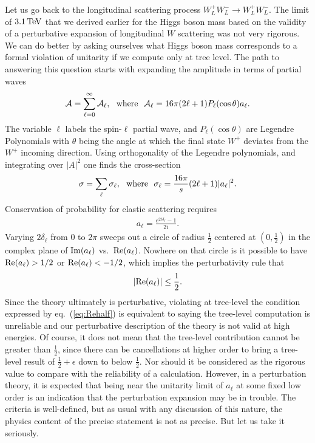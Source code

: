 \documentclass[12pt]{article}
\def\beq{\begin{eqnarray}}
\def\eeq{\end{eqnarray}}
\def\tev{\, {\rm TeV}}
\def\eq#1{eq.~(\ref{#1})}
\begin{document}
Let us go back to the longitudinal scattering process $W^+_LW^-_L\to W^+_LW^-_L$. The limit of $3.1\tev$ that we derived earlier for the Higgs boson mass based on the validity of a perturbative expansion of longitudinal $W$ scattering was not very rigorous. We can do better by asking ourselves what Higgs boson mass corresponds to a formal violation of unitarity if we compute only at tree level. The path to answering this question starts with expanding the amplitude in terms of 
partial waves~\cite{partial wave}
\beq
{\cal A}=\sum_{\ell=0}^\infty {\cal A}_\ell,~~{\rm where}~~{\cal A}_\ell=16\pi(2\ell +1)P_\ell(\cos\theta)a_\ell .
\eeq
The variable $\ell$ labels the spin-$\ell$ partial wave, and $P_\ell(\cos\theta)$ are Legendre Polynomials with $\theta$ being the angle at which the final state $W^+$ deviates from the $W^+$ incoming direction.  Using orthogonality of the Legendre polynomials, and integrating over $|A|^2$ one finds the cross-section
\beq
\sigma=\sum_\ell \sigma_\ell,~~{\rm where}~~\sigma_\ell=\frac{16\pi}{s}(2\ell +1) |a_\ell |^2.
\label{eq:sigma1}
\eeq
Conservation of probability for elastic scattering requires
\beq
a_\ell =\frac{e^{2i\delta_\ell}-1}{2i}.
\label{eq:al}
\eeq
Varying $2\delta_\ell$ from $0$ to $2\pi$ sweeps out a circle of radius $\frac{1}{2}$ centered at $(0,\frac{1}{2})$ in the complex plane of ${\rm Im}(a_\ell)$ vs.\ ${\rm Re}(a_\ell)$. Nowhere on that circle is it possible to have ${\rm Re}(a_\ell)>1/2$ or ${\rm Re}(a_\ell)<-1/2$, which implies the perturbativity rule that
\beq
|{\rm Re}(a_\ell)|\leq \frac{1}{2}.
\label{eq:Rehalf}
\eeq
Since the theory ultimately is perturbative, violating at tree-level the condition expressed by \eq{eq:Rehalf} is equivalent to saying the tree-level computation is unreliable and our perturbative description of the theory is not valid at high energies. Of course, it does not mean that the tree-level contribution cannot be greater than $\frac{1}{2}$, since there can be cancellations at higher order to bring a tree-level result of $\frac{1}{2}+\epsilon$ down to below $\frac{1}{2}$. Nor should it be considered as the rigorous value to compare with the reliability of a calculation.  However, in a perturbation theory, it is expected that being near the unitarity limit of $a_\ell$ at some fixed low order is an indication that the perturbation expansion may be in trouble.  The criteria is well-defined, but as usual with any discussion of this nature, the physics content of the precise statement is not as precise. But let us take it seriously.
\end{document}
